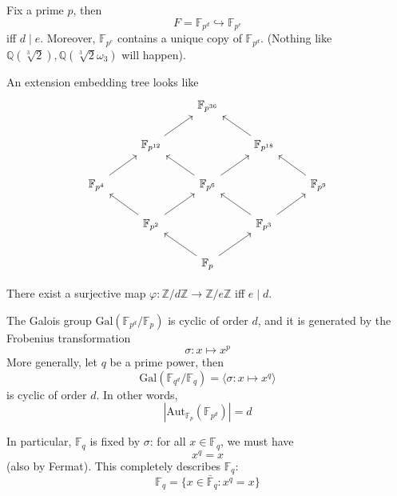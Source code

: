 \documentclass[openany]{book}
\newcommand{\Z}{\mathbb{Z}}
\newcommand{\F}{\mathbb{F}}
\newcommand{\la}{\langle}
\newcommand{\ra}{\rangle}
\newcommand{\Q}{\mathbb{Q}}
\newcommand{\gal}{\text{Gal}}
\newcommand{\aut}{\text{Aut}}
\newcommand{\om}{\omega}
\begin{document}
\begin{prop}
    Fix a prime $p$, then 
    \begin{equation*}
        F=\F_{p^d}\hookrightarrow \F_{p^e}
    \end{equation*}
    iff $d \mid e$. Moreover, $\F_{p^e}$ contains a unique copy of $\F_{p^d}$. (Nothing like $\Q(\sqrt[3]{2}), \Q(\sqrt[3]{2}\om_3)$ will happen). 
\end{prop}

\begin{example}
    An extension embedding tree looks like 
    \[\begin{tikzcd}
        && {\mathbb{F}_{p^{36}}} \\
        & {\mathbb{F}_{p^{12}}} && {\mathbb{F}_{p^{18}}} \\
        {\mathbb{F}_{p^4}} && {\mathbb{F}_{p^6}} && {\mathbb{F}_{p^9}} \\
        & {\mathbb{F}_{p^2}} && {\mathbb{F}_{p^3}} \\
        && {\mathbb{F}_p}
        \arrow[from=2-2, to=1-3]
        \arrow[from=2-4, to=1-3]
        \arrow[from=3-1, to=2-2]
        \arrow[from=3-3, to=2-2]
        \arrow[from=3-3, to=2-4]
        \arrow[from=3-5, to=2-4]
        \arrow[from=4-2, to=3-1]
        \arrow[from=4-2, to=3-3]
        \arrow[from=4-4, to=3-3]
        \arrow[from=4-4, to=3-5]
        \arrow[from=5-3, to=4-2]
        \arrow[from=5-3, to=4-4]
    \end{tikzcd}\]
\end{example}

\begin{prop}
    There exist a surjective map $\varphi: \Z/d\Z\to\Z/e\Z$ iff $e \mid d$.
\end{prop}

\begin{prop}
    The Galois group $\gal(\F_{p^d}/\F_p)$ is cyclic of order $d$, and it is generated by the Frobenius transformation 
    \begin{equation*}
        \sigma: x\mapsto x^p
    \end{equation*}
    More generally, let $q$ be a prime power, then 
    \begin{equation*}
        \gal(\F_{q^d}/\F_q)=\la \sigma: x\mapsto x^q\ra
    \end{equation*}
    is cyclic of order $d$. In other words, 
    \begin{equation*}
        |\aut_{\F_p}(\F_{p^d})|=d
    \end{equation*}
\end{prop}
In particular, $\F_q$ is fixed by $\sigma$: for all $x\in\F_q$, we must have 
\begin{equation*}
    x^q=x
\end{equation*}
(also by Fermat). This completely describes $\F_q$:
\begin{equation*}
    \F_q=\{x\in\bar{\F}_q: x^q=x\}
\end{equation*}
\end{document}
